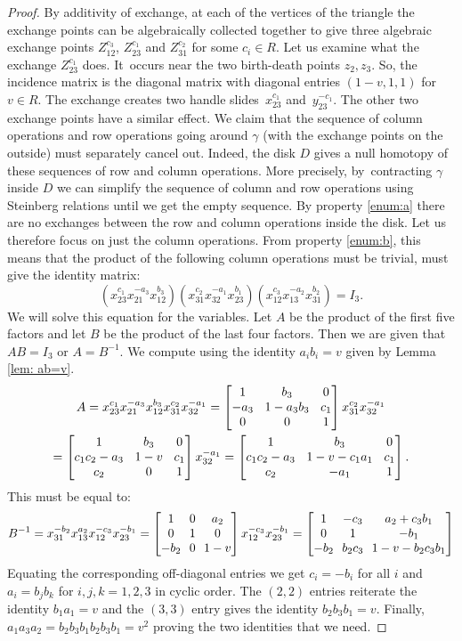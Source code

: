 \documentclass[JEP,XML,SOM,Unicode,NoFloatCountersInSection]{cedram}
\theoremstyle{plain}
\theoremstyle{definition}
\newcommand{\mat}[1]{\ensuremath{
\left[\begin{matrix}#1
\end{matrix}\right]
}}
\begin{document}
\begin{proof}
By additivity of exchange, at each of the vertices of the triangle the exchange points can be algebraically collected together to give three algebraic exchange points $Z_{12}^{c_3}$, $Z_{23}^{c_1}$ and $Z_{31}^{c_2}$ for some $c_i\in R$.
Let us examine what the exchange $Z_{23}^{c_1}$ does. It~occurs near the two birth-death points $z_2,z_3$. So, the incidence matrix is the diagonal matrix with diagonal entries $(1-v,1,1)$ for $v\in R$. The exchange creates two handle slides~$x_{23}^{c_1}$ and~$y_{23}^{-c_1}$. The other two exchange points have a similar effect. We claim that the sequence of column operations and row operations going around $\gamma$ (with the exchange points on the outside) must separately cancel out. Indeed, the disk $D$ gives a null homotopy of these sequences of row and column operations. More precisely, by~contracting $\gamma$ inside $D$ we can simplify the sequence of column and row operations using Steinberg relations until we get the empty sequence. By property \eqref{enum:a} there are no exchanges between the row and column operations inside the disk. Let us therefore focus on just the column operations. From property \eqref{enum:b}, this means that the product of the following column operations must be trivial, \ie must give the identity matrix:
\[
(x_{23}^{c_1}x_{21}^{-a_3}x_{12}^{b_3})
(x_{31}^{c_2}x_{32}^{-a_1}x_{23}^{b_1})
(x_{12}^{c_3}x_{13}^{-a_2}x_{31}^{b_2})=I_3.
\]
We will solve this equation for the variables. Let $A$ be the product of the first five factors and let $B$ be the product of the last four factors. Then we are given that $AB=I_3$ or $A=B^{-1}$. We compute using the identity $a_ib_i=v$ given by Lemma \ref{lem: ab=v}.
\begin{multline*}
\arraycolsep4.5pt
A=x_{23}^{c_1}x_{21}^{-a_3}x_{12}^{b_3}x_{31}^{c_2}x_{32}^{-a_1}=\mat{1 & b_3 & 0\\
-a_3 & 1-a_3b_3 & c_1\\
0 & 0 & 1
}x_{31}^{c_2}x_{32}^{-a_1}
\\ \arraycolsep4.5pt
= \mat{1 & b_3 & 0\\
c_1c_2-a_3 & 1-v & c_1\\
c_2 & 0 & 1}x_{32}^{-a_1}
= \mat{1 & b_3 & 0\\
c_1c_2-a_3 & 1-v-c_1a_1 & c_1\\
c_2 & -a_1 & 1}.
\end{multline*}
This must be equal to:
\[\arraycolsep3.5pt
B^{-1}=x_{31}^{-b_2}x_{13}^{a_2}x_{12}^{-c_3}x_{23}^{-b_1}=\mat{1 & 0 & a_2\\
0 & 1 & 0\\
-b_2 & 0 & 1-v}x_{12}^{-c_3}x_{23}^{-b_1}
= \mat{
1 & -c_3 & a_2+c_3b_1\\
0 & 1 & -b_1\\
-b_2 & b_2c_3 & 1-v-b_2c_3b_1
}
\]
Equating the corresponding off-diagonal entries we get $c_i=-b_i$ for all $i$ and $a_i=b_jb_k$ for $i,j,k=1,2,3$ in cyclic order. The $(2,2)$ entries reiterate the identity $b_1a_1=v$ and the $(3,3)$ entry gives the identity $b_2b_3b_1=v$. Finally, $a_1a_3a_2=b_2b_3b_1b_2b_3b_1=v^2$ proving the two identities that we need.


\end{proof}
\end{document}
